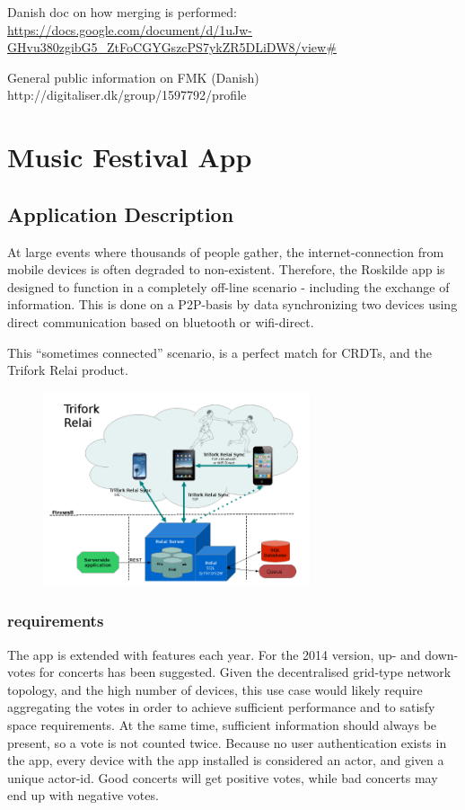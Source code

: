 \documentclass[11pt,a4paper]{report}
\begin{document}
Danish doc on how merging is performed:
\url{https://docs.google.com/document/d/1uJw-GHvu380zgibG5_ZtFoCGYGszcPS7ykZR5DLiDW8/view#}

General public information on FMK (Danish)
http://digitaliser.dk/group/1597792/profile

\section{Music Festival App}

\subsection{Application Description}
At large events where thousands of people gather, the internet-connection from mobile devices is often degraded to non-existent. Therefore, the Roskilde app is designed to function in a completely off-line scenario - including the exchange of information. This is done on a P2P-basis by data synchronizing two devices using  direct communication based on bluetooth or wifi-direct.

This ``sometimes connected'' scenario, is a perfect match for CRDTs, and the Trifork Relai product.

\begin{figure}[!h]
	\centering
	\includegraphics[width=0.7\textwidth]{./img/image4.png}
\end{figure}

\subsubsection{requirements}
The app is extended with features each year. For the 2014 version, up- and down-votes for concerts has been suggested. Given the decentralised grid-type network topology, and the high number of devices, this use case would likely require aggregating the votes in order to achieve sufficient performance and to satisfy space requirements.
At the same time, sufficient information should always be present, so a vote is not counted twice. Because no user authentication exists in the app, every device with the app installed is considered an actor, and given a unique actor-id.
Good concerts will get positive votes, while bad concerts may end up with negative votes.
\end{document}

